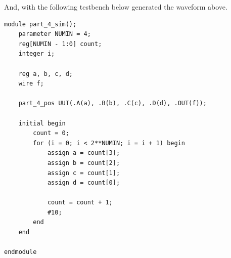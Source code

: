 And, with the following testbench below generated the waveform above.
\begin{lstlisting}[caption={Part 4 Testbench}, label={Part 4 Testbench}, style=Verilog]
module part_4_sim();
    parameter NUMIN = 4;
    reg[NUMIN - 1:0] count;
    integer i;
    
    reg a, b, c, d;
    wire f;
    
    part_4_pos UUT(.A(a), .B(b), .C(c), .D(d), .OUT(f));
    
    initial begin
        count = 0;
        for (i = 0; i < 2**NUMIN; i = i + 1) begin
            assign a = count[3];
            assign b = count[2];
            assign c = count[1];
            assign d = count[0];
            
            count = count + 1;
            #10;
        end
    end
    
endmodule
\end{lstlisting}


\newpage
